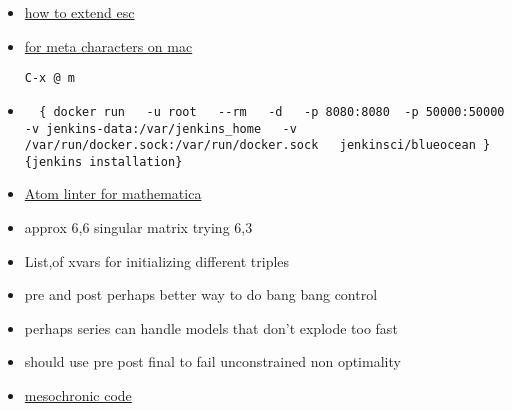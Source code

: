 \documentclass[hyperref]{labbook}
\begin{document}
\begin{itemize}
\item \href{https://emacs.stackexchange.com/questions/3992/how-to-extend-the-esc-m-translation-to-non-character-keys}{how to extend esc}
\item \href{https://emacs.stackexchange.com/questions/3971/how-to-type-org-modes-m-bindings-in-emacs-for-mac}{for meta characters on mac}
\begin{verbatim}
C-x @ m
\end{verbatim}

\item
\begin{verbatim}
  { docker run   -u root   --rm   -d   -p 8080:8080  -p 50000:50000  -v jenkins-data:/var/jenkins_home   -v /var/run/docker.sock:/var/run/docker.sock   jenkinsci/blueocean }{jenkins installation}

\end{verbatim}
\end{itemize}


\begin{itemize}
\item \href{https://atom.io/packages/linter-mathematica}{Atom linter for mathematica}
\end{itemize}

\begin{itemize}
\item approx 6,6 singular matrix  trying 6,3
\end{itemize}

\begin{itemize}
\item List,of xvars for initializing different triples
\item pre and post perhaps better way to do bang bang control
\item perhaps series can handle models that don't explode too fast
\item should use pre post final to fail unconstrained non optimality
\end{itemize}

\begin{itemize}
\item \href{http://people.clarkson.edu/~mbudisic/software.html}{mesochronic code}
\end{itemize}
\end{document}
